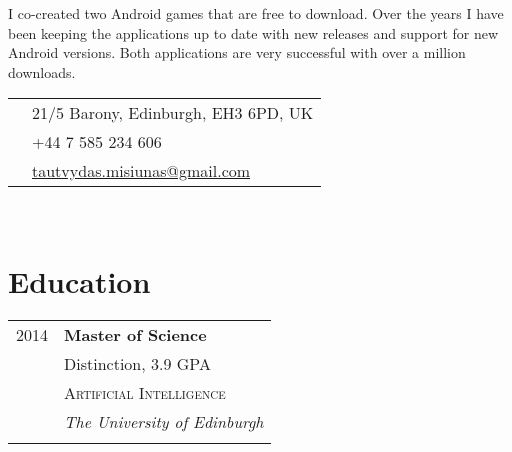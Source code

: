 \documentclass[10pt]{article} %
\begin{document}
{\begin{minipage}[t]{0.5\textwidth}
\normalsize{I co-created two Android games that are free to download. Over the years I have been keeping the applications up to date with new releases and support for new Android versions. Both applications are very successful with over a million downloads.}\\


\end{minipage} %
\hfill
\begin{minipage}[t]{0.44\textwidth} %
\vspace{0pt} %


\colorbox{shade}{\textcolor{text1}{
\begin{tabular}{c|p{7cm}}
\raisebox{-4pt}{\textifsymbol{18}} & 21/5 Barony, Edinburgh, EH3 6PD, UK \\ %
\raisebox{-3pt}{\Mobilefone} & +44 7 585 234 606 \\ %
\raisebox{-1pt}{\Letter} & \href{mailto:tautvydas.misiunas@gmail.com}{tautvydas.misiunas@gmail.com} \\ %
\end{tabular}
}
}\\[10pt]


\section{Education} 

\begin{tabular}{rl} %

2014 & \textbf{Master of Science} \\ 
& \small Distinction, 3.9 GPA \\
& \textsc{Artificial Intelligence} \\ 
& \textit{The University of Edinburgh}\\
&\\


\end{tabular}
\end{minipage}}
\end{document}
